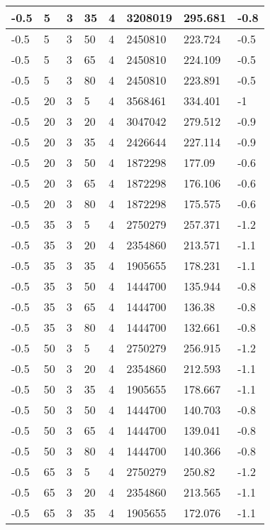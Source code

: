 \begin{longtable}{|p{1.4cm}|p{1.4cm}|p{1.4cm}|p{1.4cm}|p{1.4cm}|p{1.4cm}|p{1.4cm}|p{1.5cm}|}
        -0.5 & 5 & 3 & 35 & 4 & 3208019 & 295.681 & -0.8 \\ \hline
        -0.5 & 5 & 3 & 50 & 4 & 2450810 & 223.724 & -0.5 \\ \hline
        -0.5 & 5 & 3 & 65 & 4 & 2450810 & 224.109 & -0.5 \\ \hline
        -0.5 & 5 & 3 & 80 & 4 & 2450810 & 223.891 & -0.5 \\ \hline
        -0.5 & 20 & 3 & 5 & 4 & 3568461 & 334.401 & -1 \\ \hline
        -0.5 & 20 & 3 & 20 & 4 & 3047042 & 279.512 & -0.9 \\ \hline
        -0.5 & 20 & 3 & 35 & 4 & 2426644 & 227.114 & -0.9 \\ \hline
        -0.5 & 20 & 3 & 50 & 4 & 1872298 & 177.09 & -0.6 \\ \hline
        -0.5 & 20 & 3 & 65 & 4 & 1872298 & 176.106 & -0.6 \\ \hline
        -0.5 & 20 & 3 & 80 & 4 & 1872298 & 175.575 & -0.6 \\ \hline
        -0.5 & 35 & 3 & 5 & 4 & 2750279 & 257.371 & -1.2 \\ \hline
        -0.5 & 35 & 3 & 20 & 4 & 2354860 & 213.571 & -1.1 \\ \hline
        -0.5 & 35 & 3 & 35 & 4 & 1905655 & 178.231 & -1.1 \\ \hline
        -0.5 & 35 & 3 & 50 & 4 & 1444700 & 135.944 & -0.8 \\ \hline
        -0.5 & 35 & 3 & 65 & 4 & 1444700 & 136.38 & -0.8 \\ \hline
        -0.5 & 35 & 3 & 80 & 4 & 1444700 & 132.661 & -0.8 \\ \hline
        -0.5 & 50 & 3 & 5 & 4 & 2750279 & 256.915 & -1.2 \\ \hline
        -0.5 & 50 & 3 & 20 & 4 & 2354860 & 212.593 & -1.1 \\ \hline
        -0.5 & 50 & 3 & 35 & 4 & 1905655 & 178.667 & -1.1 \\ \hline
        -0.5 & 50 & 3 & 50 & 4 & 1444700 & 140.703 & -0.8 \\ \hline
        -0.5 & 50 & 3 & 65 & 4 & 1444700 & 139.041 & -0.8 \\ \hline
        -0.5 & 50 & 3 & 80 & 4 & 1444700 & 140.366 & -0.8 \\ \hline
        -0.5 & 65 & 3 & 5 & 4 & 2750279 & 250.82 & -1.2 \\ \hline
        -0.5 & 65 & 3 & 20 & 4 & 2354860 & 213.565 & -1.1 \\ \hline
        -0.5 & 65 & 3 & 35 & 4 & 1905655 & 172.076 & -1.1 \\ \hline

\end{longtable}
